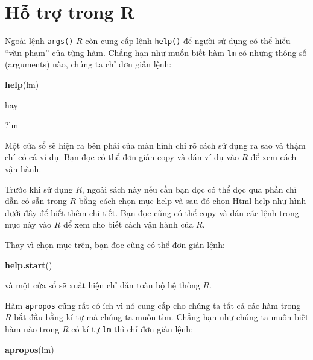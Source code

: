 \documentclass[
]{book}
\newenvironment{Shaded}{\begin{snugshade}}{\end{snugshade}}
\newcommand{\KeywordTok}[1]{\textcolor[rgb]{0.13,0.29,0.53}{\textbf{#1}}}
\newcommand{\NormalTok}[1]{#1}
\begin{document}
\hypertarget{hux1ed7-trux1ee3-trong-r}{%
\section{Hỗ trợ trong R}\label{hux1ed7-trux1ee3-trong-r}}

Ngoài lệnh \texttt{args()} \(R\) còn cung cấp lệnh \texttt{help()} để người sử dụng có thể hiểu ``văn phạm'' của từng hàm. Chẳng hạn như muốn biết hàm \texttt{lm} có những thông số (arguments) nào, chúng ta chỉ đơn giản lệnh:

\begin{Shaded}
\begin{Highlighting}[]
\KeywordTok{help}\NormalTok{(lm)}
\end{Highlighting}
\end{Shaded}

hay

\begin{Shaded}
\begin{Highlighting}[]
\NormalTok{?lm}
\end{Highlighting}
\end{Shaded}

Một cửa sổ sẽ hiện ra bên phải của màn hình chỉ rõ cách sử dụng ra sao và thậm chí có cả ví dụ. Bạn đọc có thể đơn giản copy và dán ví dụ vào \(R\) để xem cách vận hành.

Trước khi sử dụng \(R\), ngoài sách này nếu cần bạn đọc có thể đọc qua phần chỉ dẫn có sẵn trong \(R\) bằng cách chọn mục help và sau đó chọn Html help như hình dưới đây để biết thêm chi tiết. Bạn đọc cũng có thể copy và dán các lệnh trong mục này vào \(R\) để xem cho biết cách vận hành của \(R\).

Thay vì chọn mục trên, bạn đọc cũng có thể đơn giản lệnh:

\begin{Shaded}
\begin{Highlighting}[]
\KeywordTok{help.start}\NormalTok{()}
\end{Highlighting}
\end{Shaded}

và một cửa sổ sẽ xuất hiện chỉ dẫn toàn bộ hệ thống \(R\).

Hàm \texttt{apropos} cũng rất có ích vì nó cung cấp cho chúng ta tất cả các hàm trong \(R\) bắt đầu bằng kí tự mà chúng ta muốn tìm. Chẳng hạn như chúng ta muốn biết hàm nào trong \(R\) có kí tự \texttt{lm} thì chỉ đơn giản lệnh:

\begin{Shaded}
\begin{Highlighting}[]
\KeywordTok{apropos}\NormalTok{(lm)}
\end{Highlighting}
\end{Shaded}
\end{document}
